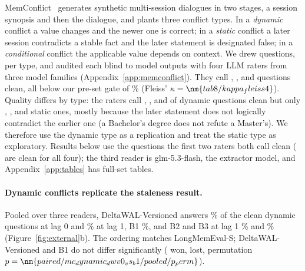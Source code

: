 MemConflict~\citep{tao2026memconflict} generates synthetic multi-session dialogues in two stages, a session synopsis and then the dialogue, and plants three conflict types. In a \emph{dynamic} conflict a value changes and the newer one is correct; in a \emph{static} conflict a later session contradicts a stable fact and the later statement is designated false; in a \emph{conditional} conflict the applicable value depends on context. We drew  questions,  per type, and audited each blind to model outputs with four LLM raters from three model families (Appendix~\ref{app:memconflict}). They call , ,  and  questions clean, all below our pre-set gate of \% (Fleiss' $\kappa=\nm{tab8/kappa_fleiss4}$). Quality differs by type: the raters call , ,  and  of  dynamic questions clean but only , ,  and  static ones, mostly because the later statement does not logically contradict the earlier one (a Bachelor's degree does not refute a Master's). We therefore use the dynamic type as a replication and treat the static type as exploratory. Results below use the  questions the first two raters both call clean ( are clean for all four); the third reader is glm-5.3-flash, the extractor model, and Appendix~\ref{app:tables} has full-set tables.

\paragraph{Dynamic conflicts replicate the staleness result.}
Pooled over three readers, DeltaWAL-Versioned answers \% of the clean dynamic questions at lag 0 and \% at lag 1, B1 \%, and B2 and B3 at lag 1 \% and \% (Figure~\ref{fig:external}b). The ordering matches LongMemEval-S; DeltaWAL-Versioned and B1 do not differ significantly ( won,  lost, permutation $p=\nm{paired/mc_dynamic_dwv0_vs_b1/pooled/p_perm}$).


